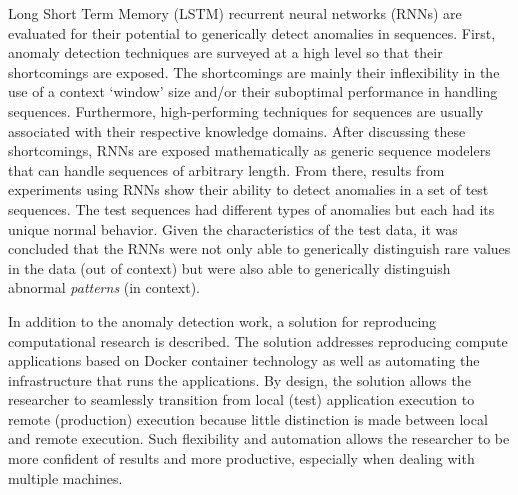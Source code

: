 \documentclass[11 pt]{report}
\begin{document}

\tableofcontents

\listoftables

\listoffigures



\abstractpage

Long Short Term Memory (LSTM) recurrent neural networks (RNNs) are evaluated for their potential to generically detect anomalies in sequences.
%
First, anomaly detection techniques are surveyed at a high level so that their shortcomings are exposed.
%
The shortcomings are mainly their inflexibility in the use of a context `window' size and/or their suboptimal performance in handling sequences.
%
Furthermore, high-performing techniques for sequences are usually associated with their respective knowledge domains.
%
After discussing these shortcomings, RNNs are exposed mathematically as generic sequence modelers that can handle sequences of arbitrary length.
%
From there, results from experiments using RNNs show their ability to detect anomalies in a set of test sequences.
%
The test sequences had different types of anomalies but each had its unique normal behavior.
%
Given the characteristics of the test data, it was concluded that the RNNs were not only able to generically distinguish rare values in the data (out of context) but were also able to generically distinguish abnormal \emph{patterns} (in context).

\abstractmultiplepage
In addition to the anomaly detection work, a solution for reproducing computational research is described.
%
The solution addresses reproducing compute applications based on \textsf{Docker} container technology as well as automating the infrastructure that runs the applications.
%
By design, the solution allows the researcher to seamlessly transition from local (test) application execution to remote (production) execution because little distinction is made between local and remote execution.
%
Such flexibility and automation allows the researcher to be more confident of results and more productive, especially when dealing with multiple machines.

\startofchapters





\end{document}
